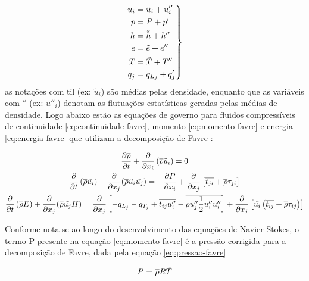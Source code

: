 \begin{equation}
\left. \begin{aligned}
  u_i &= \tilde{u}_i + u''_i \\
  p &= P + p' \\
  h &= \Tilde{h} + h'' \\
  e &= \Tilde{e} + e'' \\
  T &= \Tilde{T} + T'' \\
  q_j & = q_{L_j} + q'_j
\end{aligned}
\right\rbrace
\end{equation}
%
as notações com til (ex: $\tilde{u}_i$) são médias pelas densidade, enquanto que as variáveis com $''$ (ex: $u''_i$) denotam as flutuações estatísticas geradas pelas médias de densidade. Logo abaixo estão as equações de governo para fluidos compressíveis de continuidade \ref{eq:continuidade-favre}, momento \ref{eq:momento-favre} e energia \ref{eq:energia-favre} que utilizam a decomposição de Favre \cite{Wilcox2006}:

\begin{gather}
    \label{eq:continuidade-favre}
    \frac{\partial \overline{\rho}}{\partial t} + \frac{\partial}{\partial x_i} \left( \overline{\rho} \Tilde{u}_{i}\right) = 0 \\
    \label{eq:momento-favre}
    \frac{\partial}{\partial t}\left(\overline{\rho} \Tilde{u_i} \right) + \frac{\partial}{\partial x_j} (\overline{\rho}\Tilde{u_i}\Tilde{u_j}) = -\frac{\partial P}{\partial x_i} + \frac{\partial}{\partial x_j}\left[\overline{t_{ji}} + \overline{\rho}\tau_{ji}\right] \\
    \label{eq:energia-favre} 
    \frac{\partial}{\partial t}\left(\overline{\rho}E\right) + \frac{\partial}{\partial x_j}(\overline{\rho} \Tilde{u_{j}} H) 
    = \frac{\partial}{\partial x_j}\left[-q_{L_{j}} - q_{T_{j}} + \overline{t_{ij}u''_i} - \overline{\rho u''_j\frac{1}{2}u''_i u''_i} \right] + \frac{\partial}{\partial x_j}\left[\Tilde{u_i}\left(\overline{t_{ij}} + \overline{\rho}\tau_{ij}\right)\right]
\end{gather}

Conforme nota-se ao longo do desenvolvimento das equações de Navier-Stokes, o termo P presente na equação \ref{eq:momento-favre} é a pressão corrigida para a decomposição de Favre, dada pela equação \ref{eq:pressao-favre}

\begin{equation}
	\label{eq:pressao-favre}
	P = \overline{\rho}R\Tilde{T}
\end{equation} 

